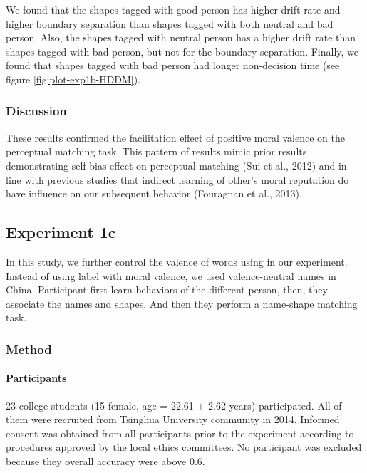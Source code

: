 \documentclass[
  english,
  man]{apa6}
\let\oldparagraph\paragraph
\renewcommand{\paragraph}[1]{\oldparagraph{#1}\mbox{}}
\begin{document}
We found that the shapes tagged with good person has higher drift rate and higher boundary separation than shapes tagged with both neutral and bad person. Also, the shapes tagged with neutral person has a higher drift rate than shapes tagged with bad person, but not for the boundary separation. Finally, we found that shapes tagged with bad person had longer non-decision time (see figure \ref{fig:plot-exp1b-HDDM}).

\hypertarget{discussion}{%
\subsubsection{Discussion}\label{discussion}}

These results confirmed the facilitation effect of positive moral valence on the perceptual matching task. This pattern of results mimic prior results demonstrating self-bias effect on perceptual matching (Sui et al., 2012) and in line with previous studies that indirect learning of other's moral reputation do have influence on our subsequent behavior (Fouragnan et al., 2013).

\hypertarget{experiment-1c}{%
\subsection{Experiment 1c}\label{experiment-1c}}

In this study, we further control the valence of words using in our experiment. Instead of using label with moral valence, we used valence-neutral names in China. Participant first learn behaviors of the different person, then, they associate the names and shapes. And then they perform a name-shape matching task.

\hypertarget{method-1}{%
\subsubsection{Method}\label{method-1}}

\hypertarget{participants-2}{%
\paragraph{Participants}\label{participants-2}}

23 college students (15 female, age = 22.61 \(\pm\) 2.62 years) participated. All of them were recruited from Tsinghua University community in 2014. Informed consent was obtained from all participants prior to the experiment according to procedures approved by the local ethics committees. No participant was excluded because they overall accuracy were above 0.6.
\end{document}
